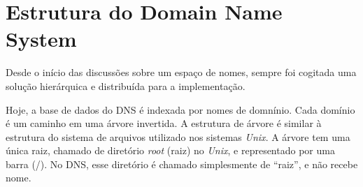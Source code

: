 \chapter{Estrutura do Domain Name System}

Desde o início das discussões sobre um espaço de nomes, sempre foi
cogitada uma solução hierárquica e distribuída \cite{rfc1034} para a
implementação.

Hoje, a base de dados do DNS é indexada por nomes de domnínio. Cada
domínio é um caminho em uma árvore invertida. A estrutura de árvore é
similar à estrutura do sistema de arquivos utilizado nos sistemas
\textit{Unix}. A árvore tem uma única raiz, chamado de diretório
\textit{root} (raiz) no \textit{Unix}, e representado por uma barra
(/). No DNS, esse diretório é chamado simplesmente de ``raiz'', e não
recebe nome.
